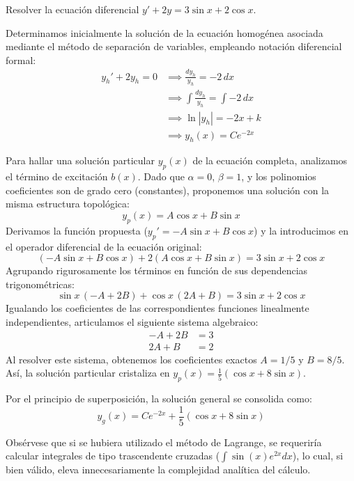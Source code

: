 \begin{ejercicio}
Resolver la ecuación diferencial $y' + 2y = 3\sin x + 2\cos x$.
\end{ejercicio}

\begin{tcolorbox}
Determinamos inicialmente la solución de la ecuación homogénea asociada mediante el método de separación de variables, empleando notación diferencial formal:
\begin{align*}
    y_h' + 2y_h = 0 &\implies \frac{dy_h}{y_h} = -2\,dx \\
    &\implies \int \frac{dy_h}{y_h} = \int -2\,dx \\
    &\implies \ln|y_h| = -2x + k \\
    &\implies y_h(x) = C e^{-2x}
\end{align*}

Para hallar una solución particular $y_p(x)$ de la ecuación completa, analizamos el término de excitación $b(x)$. Dado que $\alpha = 0$, $\beta = 1$, y los polinomios coeficientes son de grado cero (constantes), proponemos una solución con la misma estructura topológica:
$$ y_p(x) = A\cos x + B\sin x $$
Derivamos la función propuesta ($y_p' = -A\sin x + B\cos x$) y la introducimos en el operador diferencial de la ecuación original:
$$ (-A\sin x + B\cos x) + 2(A\cos x + B\sin x) = 3\sin x + 2\cos x $$
Agrupando rigurosamente los términos en función de sus dependencias trigonométricas:
$$ \sin x \, (-A + 2B) + \cos x \, (2A + B) = 3\sin x + 2\cos x $$
Igualando los coeficientes de las correspondientes funciones linealmente independientes, articulamos el siguiente sistema algebraico:
\begin{align*}
    -A + 2B &= 3 \\
     2A + B &= 2 
\end{align*}
Al resolver este sistema, obtenemos los coeficientes exactos $A = 1/5$ y $B = 8/5$. Así, la solución particular cristaliza en $y_p(x) = \frac{1}{5}(\cos x + 8\sin x)$.

Por el principio de superposición, la solución general se consolida como:
$$ y_g(x) = C e^{-2x} + \frac{1}{5}(\cos x + 8\sin x) $$

Obsérvese que si se hubiera utilizado el método de Lagrange, se requeriría calcular integrales de tipo trascendente cruzadas ($\int \sin(x)e^{2x}dx$), lo cual, si bien válido, eleva innecesariamente la complejidad analítica del cálculo.
\end{tcolorbox}

